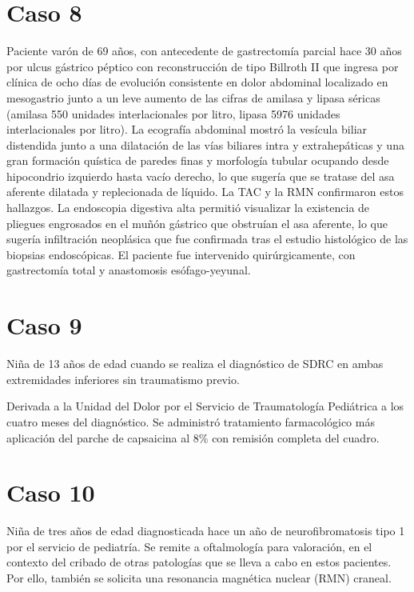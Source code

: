 \section{Caso 8}\label{anexo:texto_caso_8}

Paciente varón de 69 años, con antecedente de gastrectomía parcial hace 30 años por ulcus gástrico
péptico con reconstrucción de tipo Billroth II que ingresa por clínica de ocho días de evolución
consistente en dolor abdominal localizado en mesogastrio junto a un leve aumento de las cifras de
amilasa y lipasa séricas (amilasa 550 unidades interlacionales por litro, lipasa 5976 unidades
interlacionales por litro). La ecografía abdominal mostró la vesícula biliar distendida junto a una
dilatación de las vías biliares intra y extrahepáticas y una gran formación quística de paredes
finas y morfología tubular ocupando desde hipocondrio izquierdo hasta vacío derecho, lo que sugería
que se tratase del asa aferente dilatada y replecionada de líquido. La TAC y la RMN confirmaron
estos hallazgos. La endoscopia digestiva alta permitió visualizar la existencia de pliegues
engrosados en el muñón gástrico que obstruían el asa aferente, lo que sugería infiltración
neoplásica que fue confirmada tras el estudio histológico de las biopsias endoscópicas. El paciente
fue intervenido quirúrgicamente, con gastrectomía total y anastomosis esófago-yeyunal.

\section{Caso 9}\label{anexo:texto_caso_9}

Niña de 13 años de edad cuando se realiza el diagnóstico de SDRC en ambas extremidades inferiores
sin traumatismo previo.

Derivada a la Unidad del Dolor por el Servicio de Traumatología Pediátrica a los cuatro meses del
diagnóstico. Se administró tratamiento farmacológico más aplicación del parche de capsaicina al 8\%
con remisión completa del cuadro.

\section{Caso 10}\label{anexo:texto_caso_10}

Niña de tres años de edad diagnosticada hace un año de neurofibromatosis tipo 1 por el servicio de
pediatría. Se remite a oftalmología para valoración, en el contexto del cribado de otras patologías
que se lleva a cabo en estos pacientes. Por ello, también se solicita una resonancia magnética
nuclear (RMN) craneal.

